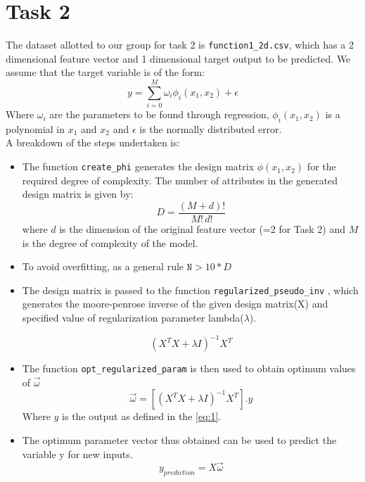 \documentclass[12pt,a4paper]{article}
\def\tt#1{\texttt{#1}}
\begin{document}
\section{Task 2}
The dataset allotted to our group for task 2 is \tt{function1\_2d.csv}, which has a 2 dimensional feature vector and 1 dimensional target output to be predicted. We assume that the target variable is of the form:
\begin{equation}\label{eq:1}
    y=\sum_{i=0}^M\omega _{i}\phi_{i}(x_1,x_2)  +\epsilon 
\end{equation}
Where $\omega_{i}$ are the parameters to be found through regression, $\phi_{i}(x_1,x_2)$ is a polynomial in $x_1$ and $x_2$ and $\epsilon$ is the normally distributed error. 
\\ A breakdown of the steps undertaken is:

\begin{itemize}
    \itemsep0em
    \item The function \tt{create\_phi} generates the design matrix $\phi(x_1,x_2)$ for the required degree of complexity.
    The number of attributes in the generated design matrix is given by:
    \begin{equation}
        D=\frac{(M+d)!}{M!\,d!}
    \end{equation}
    where $d$ is the dimension of the original feature vector (=2 for Task 2) and $M$ is the degree of complexity of the model.
    \item To avoid overfitting, as a general rule $\tt{N}>10*D$
    \item The design matrix is passed to the function \tt{regularized\_pseudo\_inv} , which generates the moore-penrose inverse of the given design matrix(X) and specified value of regularization parameter lambda($\lambda$).
    
    \begin{equation}
         (X^{T}X+\lambda I)^{-1}X^{T}
    \end{equation}
    
    \item The function \tt{opt\_regularized\_param} is then used to obtain optimum values of $\vec{\omega}$
    \begin{equation}
        \vec{\omega} = [(X^{T}X+\lambda I)^{-1}X^{T}].y
    \end{equation}
    Where $y$ is the output as defined in the \autoref{eq:1}.
    
    \item The optimum parameter vector thus obtained can be used to predict the variable y for new inputs. 
    \begin{equation}
        y_{prediction}=X\vec{\omega}
    \end{equation}
\end{itemize}
\end{document}
